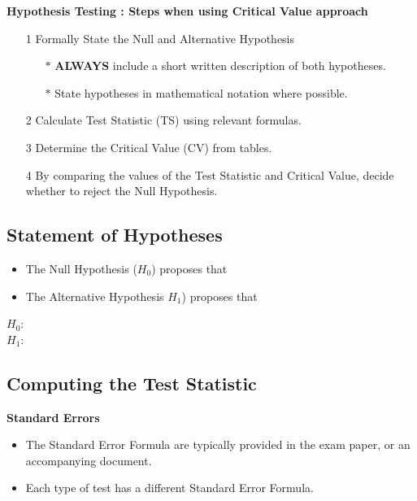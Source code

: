 \documentclass[a4paper,12pt]{article}
\begin{document}
\begin{framed}
	\noindent \textbf{Hypothesis Testing : Steps when using Critical Value approach}

\begin{itemize}
\item[1] Formally State the Null and Alternative Hypothesis \smallskip
{
\begin{itemize}
\item[$\ast$] \textbf{ALWAYS} include a short written description of both hypotheses.
\item[$\ast$] State hypotheses in mathematical notation where possible.

\end{itemize}
}
\item[2] Calculate Test Statistic (TS) using relevant formulas.\smallskip
\item[3] Determine the Critical Value (CV) from tables. \smallskip
\item[4] By comparing the values of the Test Statistic and Critical Value, decide whether to reject the Null Hypothesis.
\end{itemize}
\end{framed}

\subsection*{Statement of Hypotheses}

\begin{itemize}
\item The Null Hypothesis ($H_0$) proposes that
\item The Alternative Hypothesis $H_1$) proposes that
\end{itemize}
\begin{description}
\item[$H_0$:]
\item[$H_1$:]
\end{description}

\newpage
\subsection*{Computing the Test Statistic}

\noindent \textbf{Standard Errors}
\begin{itemize}
\item The Standard Error Formula are typically provided in the exam paper, or an accompanying document.
\item Each type of test has a different Standard Error Formula.
\end{itemize}
\bigslip
\end{document}
